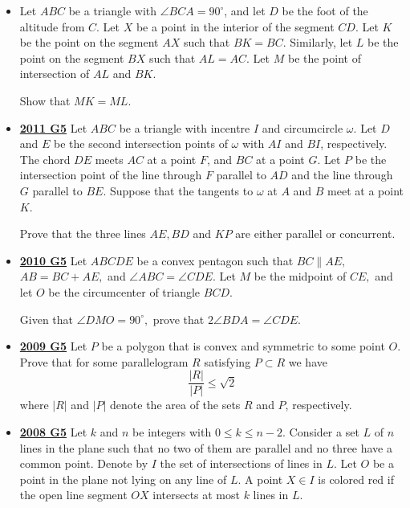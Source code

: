 \documentclass[11pt]{scrartcl}
\begin{document}
\begin{itemize}[leftmargin=*]
\item {}  Let $ABC$ be a triangle with $\angle BCA=90^{\circ}$, and let $D$ be the foot of the altitude from $C$. Let $X$ be a point in the interior of the segment $CD$. Let $K$ be the point on the segment $AX$ such that $BK=BC$. Similarly, let $L$ be the point on the segment $BX$ such that $AL=AC$. Let $M$ be the point of intersection of $AL$ and $BK$. 

Show that $MK=ML$.
\item \href{https://artofproblemsolving.com/community/c6h488830p2739330}{\textbf{2011 G5}} Let $ABC$ be a triangle with incentre $I$ and circumcircle $\omega$. Let $D$ and $E$ be the second intersection points of $\omega$ with $AI$ and $BI$, respectively. The chord $DE$ meets $AC$ at a point $F$, and $BC$ at a point $G$. Let $P$ be the intersection point of the line through $F$ parallel to $AD$ and the line through $G$ parallel to $BE$. Suppose that the tangents to $\omega$ at $A$ and $B$ meet at a point $K$. 

Prove that the three lines $AE,BD$ and $KP$ are either parallel or concurrent.
\item \href{https://artofproblemsolving.com/community/c6h418635p2361976}{\textbf{2010 G5}} 	Let $ABCDE$ be a convex pentagon such that $BC \parallel AE,$ $AB = BC +  AE,$ and $\angle ABC = \angle CDE.$ Let $M$ be the midpoint of $CE,$ and let $O$ be the circumcenter of triangle $BCD.$ 

Given that $\angle DMO = 90^{\circ},$ prove that $2 \angle BDA = \angle CDE.$
\item \href{https://artofproblemsolving.com/community/c6h355792p1932937}{\textbf{2009 G5}} 	Let $P$ be a polygon that is convex and symmetric to some point $O$. Prove that for some parallelogram $R$ satisfying $P\subset R$ we have\[\frac{|R|}{|P|}\leqslant \sqrt 2\]
where $|R|$ and $|P|$ denote the area of the sets $R$ and $P$, respectively.

\item \href{https://artofproblemsolving.com/community/c6h287867p1555923}{\textbf{2008 G5}} Let $ k$ and $ n$ be integers with $ 0\leqslant k\leqslant n - 2$. Consider a set $ L$ of $ n$ lines in the plane such that no two of them are parallel and no three have a common point. Denote by $ I$ the set of intersections of lines in $ L$. Let $ O$ be a point in the plane not lying on any line of $ L$. A point $ X\in I$ is colored red if the open line segment $ OX$ intersects at most $ k$ lines in $ L$. 


\end{itemize}
\end{document}
